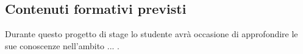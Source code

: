 \subsection{Contenuti formativi previsti}
	Durante questo progetto di stage lo studente avrà occasione di approfondire le sue conoscenze nell'ambito ... .
